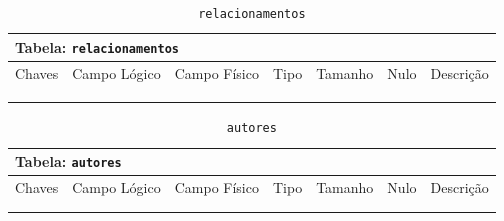 \documentclass[12pt,a4paper]{article}
\begin{document}
\begin{center}
\begin{table}[h!]
	\caption{\texttt{relacionamentos}}
	\label{tabela:relacionamentos}
	\begin{tabular}{|p{1cm}|p{1.5cm}|p{1.25cm}|p{1.25cm}|p{1.75cm}|p{1.25cm}|p{4.5cm}|}\hline	
		\multicolumn{7}{|p{16cm}|}{\cellcolor{cinzaClaro}  \centering Tabela: \texttt{relacionamentos}} \\ \hline %
		{\small Chaves} & {\small Campo Lógico} & {\small Campo Físico} & {\small Tipo} & {\small Tamanho} & {\small Nulo} & {\small Descrição}\\\hline %
		
		{\tiny } & {\tiny } & {\tiny } & {\tiny } & {\tiny } & {\tiny } &{\tiny }\\\hline
		{\tiny } & {\tiny } & {\tiny } & {\tiny } & {\tiny } & {\tiny } &{\tiny }\\\hline
		{\tiny } & {\tiny } & {\tiny } & {\tiny } & {\tiny } & {\tiny } &{\tiny }\\\hline
		
			
	\end{tabular}
\end{table}	
\end{center}

\begin{center}
\begin{table}[h!]
	\caption{\texttt{autores}}
	\label{tabela:autores}
	\begin{tabular}{|p{1cm}|p{1.5cm}|p{1.25cm}|p{1.25cm}|p{1.75cm}|p{1.25cm}|p{4.5cm}|}\hline	
		\multicolumn{7}{|p{16cm}|}{\cellcolor{cinzaClaro}  \centering Tabela: \texttt{autores}} \\ \hline %
		{\small Chaves} & {\small Campo Lógico} & {\small Campo Físico} & {\small Tipo} & {\small Tamanho} & {\small Nulo} & {\small Descrição}\\\hline %
		
		{\tiny } & {\tiny } & {\tiny } & {\tiny } & {\tiny } & {\tiny } &{\tiny }\\\hline
		{\tiny } & {\tiny } & {\tiny } & {\tiny } & {\tiny } & {\tiny } &{\tiny }\\\hline
		
			
	\end{tabular}
\end{table}	
\end{center}
\end{document}
